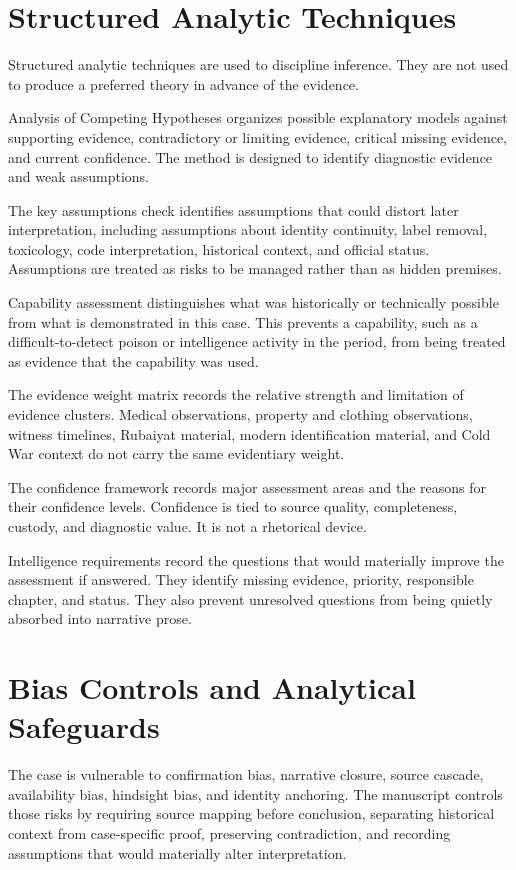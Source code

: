\section{Structured Analytic Techniques}

Structured analytic techniques are used to discipline inference. They are not used to produce a preferred theory in advance of the evidence.

Analysis of Competing Hypotheses organizes possible explanatory models against supporting evidence, contradictory or limiting evidence, critical missing evidence, and current confidence. The method is designed to identify diagnostic evidence and weak assumptions.

The key assumptions check identifies assumptions that could distort later interpretation, including assumptions about identity continuity, label removal, toxicology, code interpretation, historical context, and official status. Assumptions are treated as risks to be managed rather than as hidden premises.

Capability assessment distinguishes what was historically or technically possible from what is demonstrated in this case. This prevents a capability, such as a difficult-to-detect poison or intelligence activity in the period, from being treated as evidence that the capability was used.

The evidence weight matrix records the relative strength and limitation of evidence clusters. Medical observations, property and clothing observations, witness timelines, Rubaiyat material, modern identification material, and Cold War context do not carry the same evidentiary weight.

The confidence framework records major assessment areas and the reasons for their confidence levels. Confidence is tied to source quality, completeness, custody, and diagnostic value. It is not a rhetorical device.

Intelligence requirements record the questions that would materially improve the assessment if answered. They identify missing evidence, priority, responsible chapter, and status. They also prevent unresolved questions from being quietly absorbed into narrative prose.

\section{Bias Controls and Analytical Safeguards}

The case is vulnerable to confirmation bias, narrative closure, source cascade, availability bias, hindsight bias, and identity anchoring. The manuscript controls those risks by requiring source mapping before conclusion, separating historical context from case-specific proof, preserving contradiction, and recording assumptions that would materially alter interpretation.

